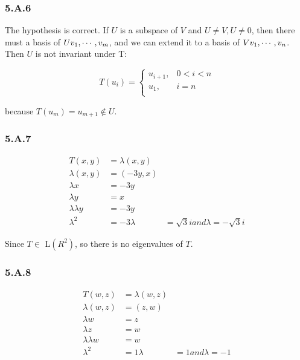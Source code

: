 \subsubsection*{5.A.6}
The hypothesis is correct. If $U$ is a subspace of $V$ and $U \neq V, U\neq 0$, then there must a basis of $U v_{1},\cdots,v_{m}$, and we can extend it to a basis of $V v_{1},\cdots,v_{n}$. Then $U$ is not invariant under T:

\[
T(u_{i}) =
\begin{cases}
u_{i+1}, & 0<i<n \\
u_{1}, & i= n\\
\end{cases}
\]

because $T(u_{m}) = u_{m+1} \notin U$.

\subsubsection*{5.A.7}

\begin{equation*}
    \begin{split}
    T(x, y) &= \lambda (x, y) \\
    \lambda(x, y) &= (-3y, x) \\
    \lambda x &= -3y \\
    \lambda y &= x \\
    \lambda\lambda y & = -3y \\
    \lambda^{2} &= -3
    \lambda &= \sqrt{3}i and \lambda = -\sqrt{3}i
\end{split}
\end{equation*}

Since $T\in$ L$(R^{2})$, so there is no eigenvalues of $T$.

\subsubsection*{5.A.8}

\begin{equation*}
    \begin{split}
    T(w, z) &= \lambda (w, z) \\
    \lambda(w, z) &= (z, w) \\
    \lambda w &= z \\
    \lambda z &= w \\
    \lambda\lambda w & = w \\
    \lambda^{2} &= 1
    \lambda &= 1 and \lambda = -1
\end{split}
\end{equation*}

